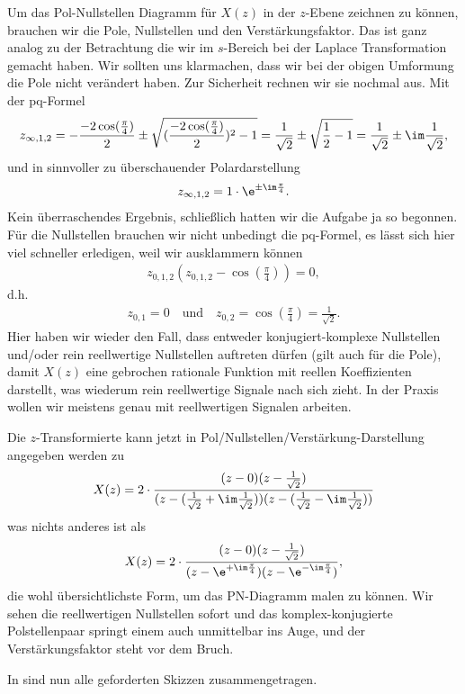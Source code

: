 \begin{ExCalc}
Um das Pol-Nullstellen Diagramm für $X(z)$ in der $z$-Ebene zeichnen zu können,
brauchen wir  die Pole, Nullstellen und den Verstärkungsfaktor.
Das ist ganz analog zu der Betrachtung die wir im $s$-Bereich bei der Laplace
Transformation gemacht haben.
%
Wir sollten uns klarmachen, dass wir bei der obigen Umformung die Pole nicht
verändert haben. Zur Sicherheit rechnen wir sie nochmal aus. Mit der pq-Formel
\begin{align}
z_{\infty,1,2} = -\frac{-2\cos(\frac{\pi}{4})}{2} \pm \sqrt{(\frac{-2 \cos(\frac{\pi}{4})}{2})^2-1}
=
\frac{1}{\sqrt{2}} \pm \sqrt{\frac{1}{2}-1}
=
\frac{1}{\sqrt{2}} \pm \im \frac{1}{\sqrt{2}},
\end{align}
und in sinnvoller zu überschauender Polardarstellung
\begin{align}
z_{\infty,1,2} = 1 \cdot \e^{\pm \im \frac{\pi}{4}}.
\end{align}
Kein überraschendes Ergebnis, schließlich hatten wir die Aufgabe ja so begonnen.
%
Für die Nullstellen brauchen wir nicht unbedingt die pq-Formel,
es lässt sich hier viel schneller erledigen, weil wir ausklammern können
\begin{align}
z_{0,1,2} (z_{0,1,2} - \cos(\frac{\pi}{4})) = 0,
\end{align}
d.h.
\begin{align}
z_{0,1} = 0\quad \text{und} \quad z_{0,2} = \cos(\frac{\pi}{4})=\frac{1}{\sqrt{2}}.
\end{align}
Hier haben wir wieder den Fall, dass entweder konjugiert-komplexe Nullstellen
und/oder rein reellwertige Nullstellen auftreten dürfen (gilt auch für die Pole),
damit $X(z)$ eine gebrochen rationale Funktion mit reellen Koeffizienten
darstellt, was wiederum rein reellwertige Signale nach sich zieht. In der Praxis
wollen wir meistens genau mit reellwertigen Signalen arbeiten.
%

Die $z$-Transformierte kann jetzt in Pol/Nullstellen/Verstärkung-Darstellung
angegeben werden zu
\begin{align}
X(z) = 2 \cdot \frac{(z-0) (z-\frac{1}{\sqrt{2}})}{(z-(\frac{1}{\sqrt{2}} + \im \frac{1}{\sqrt{2}})) (z-(\frac{1}{\sqrt{2}} - \im \frac{1}{\sqrt{2}}))}
\end{align}
was nichts anderes ist als
\begin{align}
X(z) = 2 \cdot \frac{(z-0) (z-\frac{1}{\sqrt{2}})}{(z-\e^{+ \im \frac{\pi}{4}})(z-\e^{-\im \frac{\pi}{4}})},
\end{align}
die wohl übersichtlichste Form, um das PN-Diagramm malen zu können. Wir sehen
die reellwertigen Nullstellen sofort und das komplex-konjugierte Polstellenpaar
springt einem auch unmittelbar ins Auge, und der Verstärkungsfaktor steht
vor dem Bruch.
%
\end{ExCalc}
\begin{Loesung}
In  sind nun alle geforderten Skizzen zusammengetragen.
\end{Loesung}



